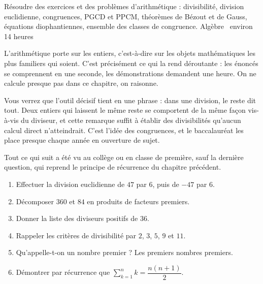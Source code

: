   {Résoudre des exercices et des problèmes d'arithmétique : divisibilité,
   division euclidienne, congruences, PGCD et PPCM, théorèmes de Bézout et de
   Gauss, équations diophantiennes, ensemble des classes de congruence.}
  {Algèbre \textbullet\ environ 14 heures}

L'arithmétique porte sur les entiers, c'est-à-dire sur les objets
mathématiques les plus familiers qui soient. C'est précisément ce qui la rend
déroutante : les énoncés se comprennent en une seconde, les démonstrations
demandent une heure. On ne calcule presque pas dans ce chapitre, on raisonne.

Vous verrez que l'outil décisif tient en une phrase : dans une division, le
reste dit tout. Deux entiers qui laissent le même reste se comportent de la
même façon vis-à-vis du diviseur, et cette remarque suffit à établir des
divisibilités qu'aucun calcul direct n'atteindrait. C'est l'idée des
congruences, et le baccalauréat les place presque chaque année en ouverture de
sujet.

\begin{revision}
Tout ce qui suit a été vu au collège ou en classe de première, sauf la
dernière question, qui reprend le principe de récurrence du chapitre précédent.

\begin{enumerate}[label=\textbf{\arabic*.}, leftmargin=*, itemsep=0.35em]
  \item Effectuer la division euclidienne de $47$ par $6$, puis de $-47$ par
        $6$.
  \item Décomposer $360$ et $84$ en produits de facteurs premiers.
  \item Donner la liste des diviseurs positifs de $36$.
  \item Rappeler les critères de divisibilité par $2$, $3$, $5$, $9$ et $11$.
  \item Qu'appelle-t-on un nombre premier ? Les premiers nombres premiers.
  \item Démontrer par récurrence que $\displaystyle\sum_{k=1}^{n}k
        = \dfrac{n(n+1)}{2}$.
\end{enumerate}
\end{revision}

